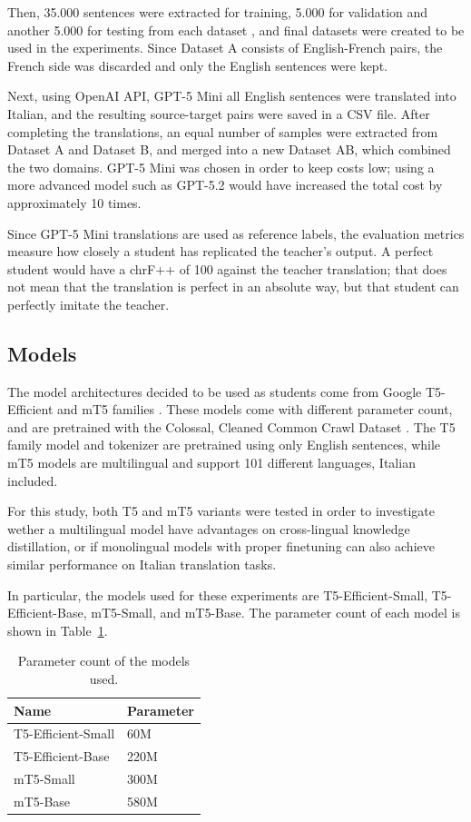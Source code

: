 \documentclass[pdflatex,sn-mathphys-num]{sn-jnl}%
\theoremstyle{thmstyleone}%
\theoremstyle{thmstyletwo}%
\theoremstyle{thmstylethree}%
\begin{document}
Then, 35.000 sentences were extracted for training, 5.000 for validation and another 5.000 for testing from each dataset \cite{vieira2024much}, and final datasets were created to be used in the experiments. Since Dataset A consists of English-French pairs, the French side was discarded and only the English sentences were kept.

Next, using OpenAI API, GPT-5 Mini all English sentences were translated into Italian, and the resulting source-target pairs were saved in a CSV file. After completing the translations, an equal number of samples were extracted from Dataset A and Dataset B, and merged into a new Dataset AB, which combined the two domains. GPT-5 Mini was chosen in order to keep costs low; using a more advanced model such as GPT-5.2 would have increased the total cost by approximately 10 times.

Since GPT-5 Mini translations are used as reference labels, the evaluation metrics measure how closely a student has replicated the teacher's output. A perfect student would have a chrF++ of 100 against the teacher translation; that does not mean that the translation is perfect in an absolute way, but that student can perfectly imitate the teacher.

\subsection{Models}\label{sec2.3}

The model architectures decided to be used as students come from Google T5-Efficient and mT5 families \cite{tay2021scale}. These models come with different parameter count, and are pretrained with the Colossal, Cleaned Common Crawl Dataset \cite{commoncrawl}. The T5 family model and tokenizer are pretrained using only English sentences, while mT5 models are multilingual and support 101 different languages, Italian included.

For this study, both T5 and mT5 variants were tested in order to investigate wether a multilingual model have advantages on cross-lingual knowledge distillation, or if monolingual models with proper finetuning can also achieve similar performance on Italian translation tasks.

In particular, the models used for these experiments are T5-Efficient-Small, T5-Efficient-Base, mT5-Small, and mT5-Base. The parameter count of each model is shown in Table~\ref{tab:parameter_count}.

\begin{table}[h]
	\centering
	\renewcommand{\arraystretch}{1.5}
	\begin{tabular}{p{} p{}}
		\hline
		\textbf{Name} & \textbf{Parameter } \\
		\hline
		T5-Efficient-Small & 60M \\
		T5-Efficient-Base & 220M \\
		mT5-Small & 300M \\
		mT5-Base & 580M \\
		\hline
	\end{tabular}
	\caption{Parameter count of the models used.}
	\label{tab:parameter_count}
\end{table}
\end{document}
